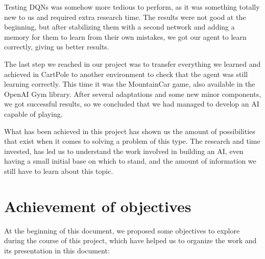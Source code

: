 Testing DQNs was somehow more tedious to perform, as it was something totally new to us and required extra research time. The results were not good at the beginning, but after stabilizing them with a second network and adding a memory for them to learn from their own mistakes, we got our agent to learn correctly, giving us better results.

The last step we reached in our project was to transfer everything we learned and achieved in CartPole to another environment to check that the agent was still learning correctly. This time it was the MountainCar game, also available in the OpenAI Gym library. After several adaptations and some new minor components, we got successful results, so we concluded that we had managed to develop an AI capable of playing.

What has been achieved in this project has shown us the amount of possibilities that exist when it comes to solving a problem of this type. The research and time invested, has led us to understand the work involved in building an AI, even having a small initial base on which to stand, and the amount of information we still have to learn about this topic.

\section{Achievement of objectives}

At the beginning of this document, we proposed some objectives to explore during the course of this project, which have helped us to organize the work and its presentation in this document:

